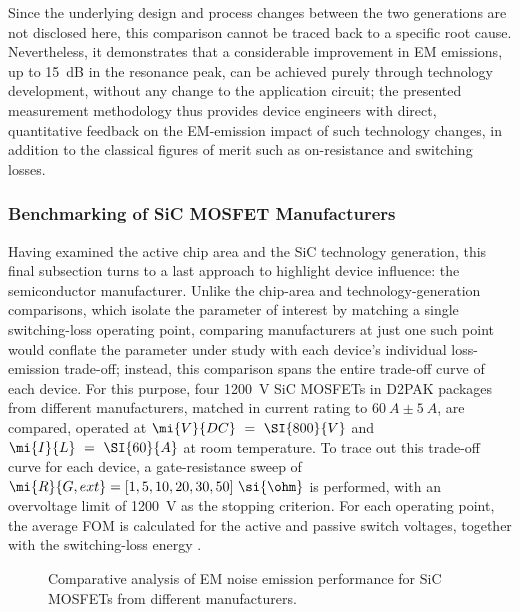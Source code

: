 Since the underlying design and process changes between the two generations are not disclosed here, this comparison cannot be traced back to a specific root cause.
Nevertheless, it demonstrates that a considerable improvement in EM emissions, up to \SI{15}{dB} in the resonance peak, can be achieved purely through technology development, without any change to the application circuit; the presented measurement methodology thus provides device engineers with direct, quantitative feedback on the EM-emission impact of such technology changes, in addition to the classical figures of merit such as on-resistance and switching losses.

\FloatBarrier


\subsubsection*{Benchmarking of SiC MOSFET Manufacturers}
\label{sec:benchmark}
Having examined the active chip area and the SiC technology generation, this final subsection turns to a last approach to highlight device influence: the semiconductor manufacturer.
Unlike the chip-area and technology-generation comparisons, which isolate the parameter of interest by matching a single switching-loss operating point, comparing manufacturers at just one such point would conflate the parameter under study with each device's individual loss-emission trade-off; instead, this comparison spans the entire trade-off curve of each device.
For this purpose, four \SI{1200}{V} SiC MOSFETs in D2PAK packages from different manufacturers, matched in current rating to $\SI{60}{A}\pm\SI{5}{A}$, are compared, operated at $\mi{V}{DC}~=~\SI{800}{V}$ and $\mi{I}{L}~=~\SI{60}{A}$ at room temperature.
To trace out this trade-off curve for each device, a gate-resistance sweep of $\mi{R}{G,ext} = [1, 5, 10, 20, 30, 50]~\si{\ohm}$ is performed, with an overvoltage limit of \SI{1200}{V} as the stopping criterion.
For each operating point, the average FOM is calculated for the active and passive switch voltages, together with the switching-loss energy .

\begin{figure}[h]
	\centering
	
	\caption{Comparative analysis of EM noise emission performance for SiC MOSFETs from different manufacturers.}
	\label{fig:MR_CompetitorAnalysis}
\end{figure}

